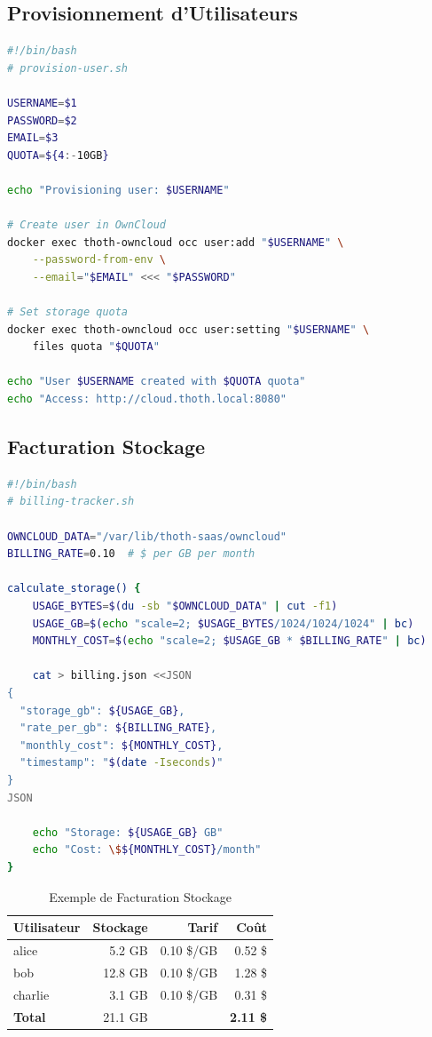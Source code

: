 \documentclass[12pt,a4paper]{article}
\begin{document}
\subsection{Provisionnement d'Utilisateurs}

\begin{lstlisting}[language=bash, caption=Script de provisionnement]
#!/bin/bash
# provision-user.sh

USERNAME=$1
PASSWORD=$2
EMAIL=$3
QUOTA=${4:-10GB}

echo "Provisioning user: $USERNAME"

# Create user in OwnCloud
docker exec thoth-owncloud occ user:add "$USERNAME" \
    --password-from-env \
    --email="$EMAIL" <<< "$PASSWORD"

# Set storage quota
docker exec thoth-owncloud occ user:setting "$USERNAME" \
    files quota "$QUOTA"

echo "User $USERNAME created with $QUOTA quota"
echo "Access: http://cloud.thoth.local:8080"
\end{lstlisting}

\subsection{Facturation Stockage}

\begin{lstlisting}[language=bash, caption=Calcul facturation stockage]
#!/bin/bash
# billing-tracker.sh

OWNCLOUD_DATA="/var/lib/thoth-saas/owncloud"
BILLING_RATE=0.10  # $ per GB per month

calculate_storage() {
    USAGE_BYTES=$(du -sb "$OWNCLOUD_DATA" | cut -f1)
    USAGE_GB=$(echo "scale=2; $USAGE_BYTES/1024/1024/1024" | bc)
    MONTHLY_COST=$(echo "scale=2; $USAGE_GB * $BILLING_RATE" | bc)
    
    cat > billing.json <<JSON
{
  "storage_gb": ${USAGE_GB},
  "rate_per_gb": ${BILLING_RATE},
  "monthly_cost": ${MONTHLY_COST},
  "timestamp": "$(date -Iseconds)"
}
JSON
    
    echo "Storage: ${USAGE_GB} GB"
    echo "Cost: \$${MONTHLY_COST}/month"
}
\end{lstlisting}

\begin{table}[H]
\centering
\begin{tabular}{@{}lrrr@{}}
\toprule
\textbf{Utilisateur} & \textbf{Stockage} & \textbf{Tarif} & \textbf{Coût} \\
\midrule
alice & 5.2 GB & 0.10 \$/GB & 0.52 \$ \\
bob & 12.8 GB & 0.10 \$/GB & 1.28 \$ \\
charlie & 3.1 GB & 0.10 \$/GB & 0.31 \$ \\
\midrule
\textbf{Total} & 21.1 GB & & \textbf{2.11 \$} \\
\bottomrule
\end{tabular}
\caption{Exemple de Facturation Stockage}
\end{table}
\end{document}
